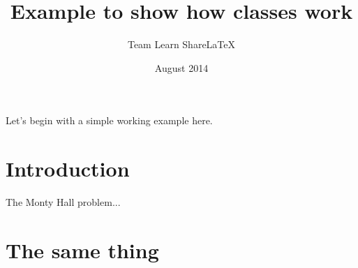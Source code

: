 \documentclass[red]{compactproposal}
\title{Example to show how classes work}
\author{Team Learn ShareLaTeX}
\date{August 2014}
\begin{document}
 
\maketitle
 
\noindent
Let's begin with a simple working example here.
 
\blindtext
 
\section{Introduction}
 
The Monty Hall problem...
 
\section{The same thing}
\end{document}

